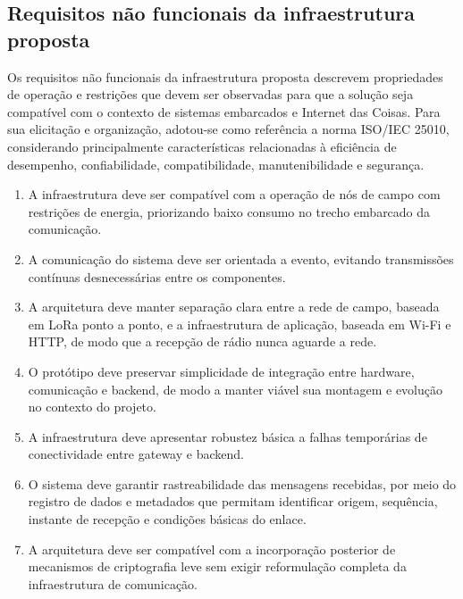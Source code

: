 
\subsection{Requisitos não funcionais da infraestrutura proposta}

Os requisitos não funcionais da infraestrutura proposta descrevem propriedades de operação e restrições que devem ser observadas para que a solução seja compatível com o contexto de sistemas embarcados e Internet das Coisas. Para sua elicitação e organização, adotou-se como referência a norma ISO/IEC 25010, considerando principalmente características relacionadas à eficiência de desempenho, confiabilidade, compatibilidade, manutenibilidade e segurança.

\begin{enumerate}
    \item[RNF1.] A infraestrutura deve ser compatível com a operação de nós de campo com restrições de energia, priorizando baixo consumo no trecho embarcado da comunicação.

    \item[RNF2.] A comunicação do sistema deve ser orientada a evento, evitando transmissões contínuas desnecessárias entre os componentes.

    \item[RNF3.] A arquitetura deve manter separação clara entre a rede de campo, baseada em LoRa ponto a ponto, e a infraestrutura de aplicação, baseada em Wi-Fi e HTTP, de modo que a recepção de rádio nunca aguarde a rede.

    \item[RNF4.] O protótipo deve preservar simplicidade de integração entre hardware, comunicação e backend, de modo a manter viável sua montagem e evolução no contexto do projeto.

    \item[RNF5.] A infraestrutura deve apresentar robustez básica a falhas temporárias de conectividade entre gateway e backend.

    \item[RNF6.] O sistema deve garantir rastreabilidade das mensagens recebidas, por meio do registro de dados e metadados que permitam identificar origem, sequência, instante de recepção e condições básicas do enlace.

    \item[RNF7.] A arquitetura deve ser compatível com a incorporação posterior de mecanismos de criptografia leve sem exigir reformulação completa da infraestrutura de comunicação.


\end{enumerate}

